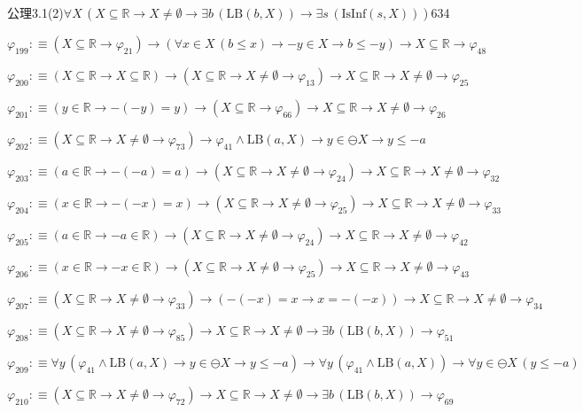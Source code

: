 \begin{fullproof}{公理3.1(2)}{$\forall X\,(X \subseteq \mathbb{R} \to X \neq \emptyset \to \exists b\,(\mathrm{LB}(b,X)) \to \exists s\,(\mathrm{IsInf}(s,X)))$}{634}
\begin{abbrevlist}
\item $\varphi_{199} :\equiv (X \subseteq \mathbb{R} \to \varphi_{21}) \to (\forall x \in X\,(b \leq x) \to -y \in X \to b \leq -y) \to X \subseteq \mathbb{R} \to \varphi_{48}$
\item $\varphi_{200} :\equiv (X \subseteq \mathbb{R} \to X \subseteq \mathbb{R}) \to (X \subseteq \mathbb{R} \to X \neq \emptyset \to \varphi_{13}) \to X \subseteq \mathbb{R} \to X \neq \emptyset \to \varphi_{25}$
\item $\varphi_{201} :\equiv (y \in \mathbb{R} \to -(-y) = y) \to (X \subseteq \mathbb{R} \to \varphi_{66}) \to X \subseteq \mathbb{R} \to X \neq \emptyset \to \varphi_{26}$
\item $\varphi_{202} :\equiv (X \subseteq \mathbb{R} \to X \neq \emptyset \to \varphi_{73}) \to \varphi_{41} \land \mathrm{LB}(a,X) \to y \in \ominus X \to y \leq -a$
\item $\varphi_{203} :\equiv (a \in \mathbb{R} \to -(-a) = a) \to (X \subseteq \mathbb{R} \to X \neq \emptyset \to \varphi_{24}) \to X \subseteq \mathbb{R} \to X \neq \emptyset \to \varphi_{32}$
\item $\varphi_{204} :\equiv (x \in \mathbb{R} \to -(-x) = x) \to (X \subseteq \mathbb{R} \to X \neq \emptyset \to \varphi_{25}) \to X \subseteq \mathbb{R} \to X \neq \emptyset \to \varphi_{33}$
\item $\varphi_{205} :\equiv (a \in \mathbb{R} \to -a \in \mathbb{R}) \to (X \subseteq \mathbb{R} \to X \neq \emptyset \to \varphi_{24}) \to X \subseteq \mathbb{R} \to X \neq \emptyset \to \varphi_{42}$
\item $\varphi_{206} :\equiv (x \in \mathbb{R} \to -x \in \mathbb{R}) \to (X \subseteq \mathbb{R} \to X \neq \emptyset \to \varphi_{25}) \to X \subseteq \mathbb{R} \to X \neq \emptyset \to \varphi_{43}$
\item $\varphi_{207} :\equiv (X \subseteq \mathbb{R} \to X \neq \emptyset \to \varphi_{33}) \to (-(-x) = x \to x = -(-x)) \to X \subseteq \mathbb{R} \to X \neq \emptyset \to \varphi_{34}$
\item $\varphi_{208} :\equiv (X \subseteq \mathbb{R} \to X \neq \emptyset \to \varphi_{85}) \to X \subseteq \mathbb{R} \to X \neq \emptyset \to \exists b\,(\mathrm{LB}(b,X)) \to \varphi_{51}$
\item $\varphi_{209} :\equiv \forall y\,(\varphi_{41} \land \mathrm{LB}(a,X) \to y \in \ominus X \to y \leq -a) \to \forall y\,(\varphi_{41} \land \mathrm{LB}(a,X)) \to \forall y \in \ominus X\,(y \leq -a)$
\item $\varphi_{210} :\equiv (X \subseteq \mathbb{R} \to X \neq \emptyset \to \varphi_{72}) \to X \subseteq \mathbb{R} \to X \neq \emptyset \to \exists b\,(\mathrm{LB}(b,X)) \to \varphi_{69}$

\end{abbrevlist}
\end{fullproof}
